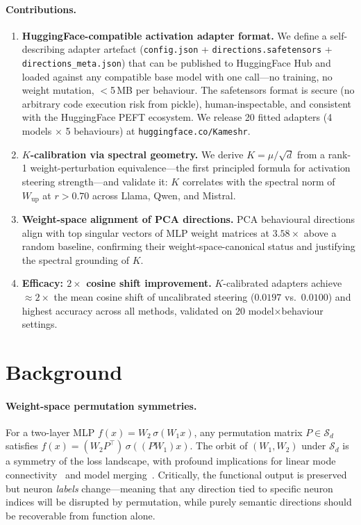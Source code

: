 \documentclass{article}
\begin{document}
\paragraph{Contributions.}
\begin{enumerate}
  \item \textbf{HuggingFace-compatible activation adapter format.}
    We define a self-describing adapter artefact
    (\texttt{config.json} + \texttt{directions.safetensors} + \texttt{directions\_meta.json})
    that can be published to HuggingFace Hub and loaded against any compatible base model
    with one call—no training, no weight mutation, $<$5\,MB per behaviour.
    The safetensors format is secure (no arbitrary code execution risk from pickle),
    human-inspectable, and consistent with the HuggingFace PEFT ecosystem.
    We release 20 fitted adapters (4 models $\times$ 5 behaviours) at
    \texttt{huggingface.co/Kameshr}.
  \item \textbf{$K$-calibration via spectral geometry.}
    We derive $K = \mu / \sqrt{d}$ from a rank-1 weight-perturbation equivalence—the
    first principled formula for activation steering strength—and validate it: $K$
    correlates with the spectral norm of $W_\mathrm{up}$ at $r > 0.70$ across
    Llama, Qwen, and Mistral.
  \item \textbf{Weight-space alignment of PCA directions.}
    PCA behavioural directions align with top singular vectors of MLP weight matrices
    at $3.58\times$ above a random baseline, confirming their weight-space-canonical
    status and justifying the spectral grounding of $K$.
  \item \textbf{Efficacy: $2\times$ cosine shift improvement.}
    $K$-calibrated adapters achieve ${\approx}2\times$ the mean cosine shift of
    uncalibrated steering ($0.0197$ vs.\ $0.0100$) and highest accuracy across
    all methods, validated on 20 model$\times$behaviour settings.
\end{enumerate}

\section{Background}
\label{sec:background}

\paragraph{Weight-space permutation symmetries.}
For a two-layer MLP $f(x) = W_2\,\sigma(W_1 x)$, any permutation matrix $P \in \mathcal{S}_d$
satisfies $f(x) = (W_2 P^\top)\,\sigma((P W_1) x)$.
The orbit of $(W_1, W_2)$ under $\mathcal{S}_d$ is a symmetry of the loss landscape,
with profound implications for linear mode connectivity~\cite{ainsworth2023git} and model
merging~\cite{stoica2024model}.
Critically, the functional output is preserved but neuron \emph{labels} change—meaning
that any direction tied to specific neuron indices will be disrupted by permutation,
while purely semantic directions should be recoverable from function alone.
\end{document}

